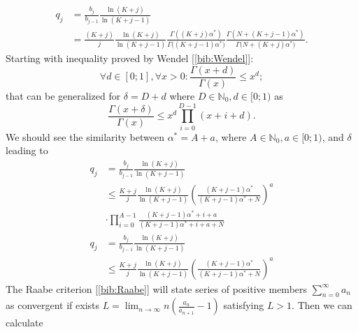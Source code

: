\begin{equation}
\begin{split}
q_j & = \frac{b_{j}}{b_{j-1}}\frac{\ln(K+j)}{\ln(K+j-1)} \\ 
&  = \frac{(K+j)}{j}\frac{\ln(K+j)}{\ln(K+j-1)} \frac{\Gamma{((K+j)\alpha^{*})}}{\Gamma{((K+j-1)\alpha^{*}})}\frac{\Gamma{(N+(K+j-1)\alpha^{*})}}{\Gamma({N+(K+j)\alpha^{*})}}.
\end{split}
\end{equation}
Starting with inequality proved by Wendel [\ref{bib:Wendel}]:
\begin{equation}
\forall d \in [0;1], \forall x > 0: \frac{ \Gamma(x + d)}{\Gamma(x)} \leq x^{d};
\end{equation}
that can be generalized for $\delta = D + d$ where $D \in \mathbb{N}_0, d \in [0;1)$ as
\begin{equation}
\frac{ \Gamma(x + \delta)}{\Gamma(x)} \leq x^{d} \prod^{D-1}_{i=0}(x+i+d).
\end{equation}
We should see the similarity between $\alpha^{*} = A + a$, where $A \in \mathbb{N}_0, a \in [0;1)$, and $\delta$ leading to
\begin{equation}
\begin{split}
q_j & = \frac{b_j}{b_{j-1}} \frac{\ln(K+j)}{\ln(K+j-1)} \\
 & \leq  \frac{K+j}{j}\frac{\ln(K+j)}{\ln(K+j-1)} {\left( \frac{(K+j-1)\alpha^*}{(K+j-1)\alpha^* + N} \right)}^{a} \\ & \cdot \prod^{A-1}_{i=0}\frac{(K+j-1)\alpha^*+i+a}{(K+j-1)\alpha^*+i+a+N}
\end{split}
\end{equation}
\begin{equation}
\begin{split}
q_j & = \frac{b_j}{b_{j-1}} \frac{\ln(K+j)}{\ln(K+j-1)} \\ 
& \leq  \frac{K+j}{j}\frac{\ln(K+j)}{\ln(K+j-1)} {\left( \frac{(K+j-1)\alpha^*}{(K+j-1)\alpha^* + N} \right)}^{a}
\end{split}
\end{equation}
The Raabe criterion [\ref{bib:Raabe}] will state series of positive members $\sum_{n=0}^{\infty} a_n$ as convergent if exists $L = \lim_{n \to \infty} n \left(\frac{a_n}{a_{n+1}}-1 \right)$ satisfying $L>1$. Then we can calculate

